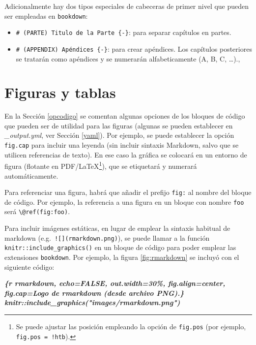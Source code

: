 \documentclass[
]{book}
\newenvironment{Shaded}{\begin{snugshade}}{\end{snugshade}}
\newcommand{\InformationTok}[1]{\textcolor[rgb]{0.56,0.35,0.01}{\textbf{\textit{#1}}}}
\theoremstyle{definition}
\theoremstyle{definition}
\theoremstyle{definition}
\theoremstyle{definition}
\theoremstyle{remark}
\begin{document}
Adicionalmente hay dos tipos especiales de cabeceras de primer nivel que pueden ser empleadas en \texttt{bookdown}:

\begin{itemize}
\item
  \texttt{\#\ (PARTE)\ Titulo\ de\ la\ Parte\ \{-\}}: para separar capítulos en partes.
\item
  \texttt{\#\ (APPENDIX)\ Apéndices\ \{-\}}: para crear apéndices. Los capítulos posteriores se tratarán como apéndices y se numerarán alfabeticamente (A, B, C, \ldots).,
\end{itemize}

\hypertarget{figuras-y-tablas}{%
\section{Figuras y tablas}\label{figuras-y-tablas}}

En la Sección \ref{opcodigo} se comentan algunas opciones de los bloques de código que pueden ser de utilidad para las figuras (algunas se pueden establecer en \emph{\_output.yml}, ver Sección \ref{yaml}).
Por ejemplo, se puede establecer la opción \texttt{fig.cap} para incluir una leyenda
(sin incluir sintaxis Markdown, salvo que se utilicen referencias de texto).
En ese caso la gráfica se colocará en un entorno de figura (flotante en
PDF/LaTeX\footnote{Se puede ajustar las posición empleando la opción de \texttt{fig.pos}
  (por ejemplo, \texttt{fig.pos\ =\ \textquotesingle{}!htb\textquotesingle{}}).}), que se etiquetará y numerará automáticamente.

Para referenciar una figura, habrá que añadir el prefijo \texttt{fig:} al nombre del bloque de código. Por ejemplo, la referencia a una figura en un bloque con nombre \texttt{foo} será \texttt{\textbackslash{}@ref(fig:foo)}.

Para incluir imágenes estáticas, en lugar de emplear la sintaxis habitual de markdown
(e.g.~\texttt{!{[}{]}(rmarkdown.png)}), se puede llamar a la función \texttt{knitr::include\_graphics()}
en un bloque de código para poder emplear las extensiones \texttt{bookdown}. Por ejemplo, la figura \ref{fig:rmarkdown} se incluyó con el siguiente código:

\begin{Shaded}
\begin{Highlighting}[]
\InformationTok{\textasciigrave{}\textasciigrave{}\textasciigrave{}\{r rmarkdown, echo=FALSE, out.width=\textquotesingle{}30\%\textquotesingle{}, fig.align=\textquotesingle{}center\textquotesingle{}, fig.cap=\textquotesingle{}Logo de rmarkdown (desde archivo PNG).\textquotesingle{}\}}
\InformationTok{knitr::include\_graphics("images/rmarkdown.png")}
\InformationTok{\textasciigrave{}\textasciigrave{}\textasciigrave{}}
\end{Highlighting}
\end{Shaded}
\end{document}
